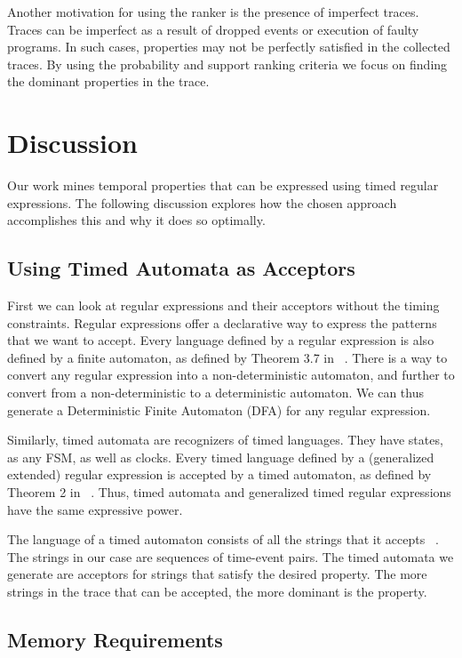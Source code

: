 \documentclass[]{sigplanconf}
\begin{document}
Another motivation for using the ranker is the presence of imperfect traces. Traces can be imperfect as a result of dropped events or execution of faulty programs. In such cases, properties may not be perfectly satisfied in the collected traces. By using the probability and support ranking criteria we focus on finding the dominant properties in the trace.


\section{Discussion} \label{discussion}

Our work mines temporal properties that can be expressed using timed regular expressions. The following discussion explores how the chosen approach accomplishes this and why it does so optimally.

\subsection{Using Timed Automata as Acceptors}

First we can look at regular expressions and their acceptors without the timing constraints. Regular expressions offer a declarative way to express the patterns that we want to accept. Every language defined by a regular expression is also defined by a finite automaton, as defined by Theorem 3.7 in ~\cite{book1}. There is a way to convert any regular expression into a non-deterministic automaton, and further to convert from a non-deterministic to a deterministic automaton. We can thus generate a Deterministic Finite Automaton (DFA) for any regular expression.

Similarly, timed automata are recognizers of timed languages. They have states, as any FSM, as well as clocks. Every timed language defined by a (generalized extended) regular expression is accepted by a timed automaton, as defined by Theorem 2 in ~\cite{timedregex}. Thus, timed automata and generalized timed regular expressions have the same expressive power.

The language of a timed automaton consists of all the strings that it accepts ~\cite{timedregex}. The strings in our case are sequences of time-event pairs. The timed automata we generate are acceptors for strings that satisfy the desired property. The more strings in the trace that can be accepted, the more dominant is the property.

\subsection{Memory Requirements}
\end{document}

